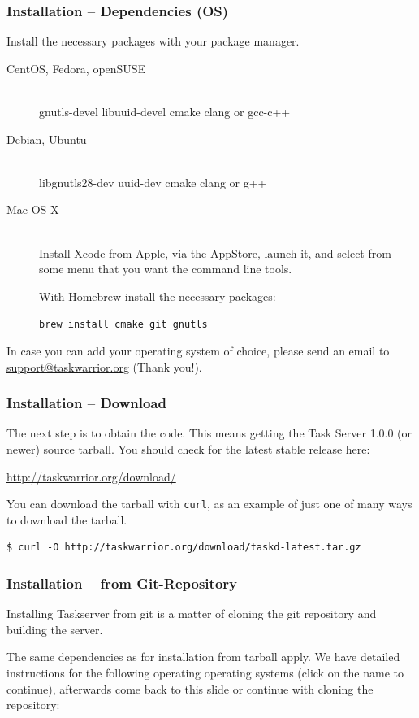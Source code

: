 \documentclass[t,handout]{beamer}
\begin{document}
\begin{frame}[fragile]\frametitle{Installation -- Dependencies (OS)}
    Install the necessary packages with your package manager.

    \begin{description}
        \item[CentOS, Fedora, openSUSE] \hfill \\
            gnutls-devel libuuid-devel cmake clang or gcc-c++
        \item[Debian, Ubuntu] \hfill \\
            libgnutls28-dev uuid-dev cmake clang or g++
        \item[Mac OS X] \hfill \\
            Install Xcode from Apple, via the AppStore, launch it, and select from some menu that you want the command line tools.

            With \href{http://brew.sh/}{Homebrew} install the necessary packages:

            \verb=brew install cmake git gnutls=
    \end{description}

    In case you can add your operating system of choice, please send an email to \href{mailto:support@taskwarrior.org}{support@taskwarrior.org} (Thank you!).
\end{frame}

\begin{frame}[fragile]\frametitle{Installation -- Download}
    The next step is to obtain the code. This means getting the Task Server 1.0.0 (or newer) source tarball.  You should check for the latest stable release here:

    \href{http://taskwarrior.org/download/}{http://taskwarrior.org/download/}

    \vfill
    You can download the tarball with \verb+curl+, as an example of just one of many ways to download the tarball.

    \begin{lstlisting}
$ curl -O http://taskwarrior.org/download/taskd-latest.tar.gz\end{lstlisting}
\end{frame}

\begin{frame}[fragile]\frametitle{Installation -- from Git-Repository}
    \vfill
    Installing Taskserver from git is a matter of cloning the git repository and building the server.

    The same dependencies as for installation from tarball apply. We have detailed instructions for the following operating operating systems (click on the name to continue), afterwards come back to this slide or continue with cloning the repository:
\end{frame}
\end{document}
